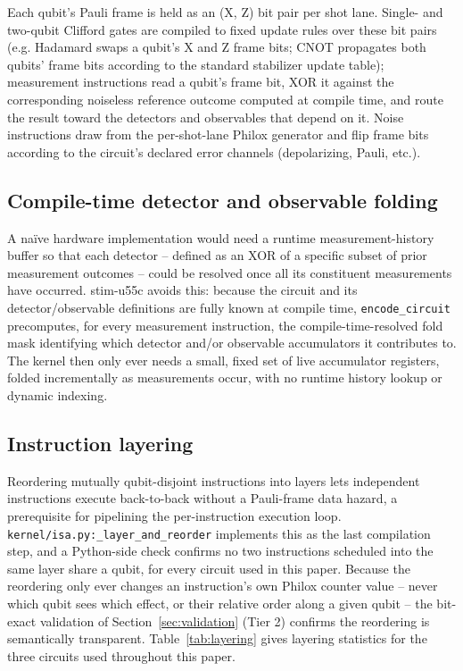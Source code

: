 \documentclass[pdflatex,sn-basic]{sn-jnl}
\begin{document}
Each qubit's Pauli frame is held as an (X, Z) bit pair per shot lane. Single- and two-qubit Clifford gates are compiled to fixed update rules over these bit pairs (e.g. Hadamard swaps a qubit's X and Z frame bits; CNOT propagates both qubits' frame bits according to the standard stabilizer update table); measurement instructions read a qubit's frame bit, XOR it against the corresponding noiseless reference outcome computed at compile time, and route the result toward the detectors and observables that depend on it. Noise instructions draw from the per-shot-lane Philox generator and flip frame bits according to the circuit's declared error channels (depolarizing, Pauli, etc.).

\subsection{Compile-time detector and observable folding}

A na\"ive hardware implementation would need a runtime measurement-history buffer so that each detector -- defined as an XOR of a specific subset of prior measurement outcomes -- could be resolved once all its constituent measurements have occurred. stim-u55c avoids this: because the circuit and its detector/observable definitions are fully known at compile time, \texttt{encode\_circuit} precomputes, for every measurement instruction, the compile-time-resolved fold mask identifying which detector and/or observable accumulators it contributes to. The kernel then only ever needs a small, fixed set of live accumulator registers, folded incrementally as measurements occur, with no runtime history lookup or dynamic indexing.

\subsection{Instruction layering}

Reordering mutually qubit-disjoint instructions into layers lets independent instructions execute back-to-back without a Pauli-frame data hazard, a prerequisite for pipelining the per-instruction execution loop. \texttt{kernel/isa.py:\_layer\_and\_reorder} implements this as the last compilation step, and a Python-side check confirms no two instructions scheduled into the same layer share a qubit, for every circuit used in this paper. Because the reordering only ever changes an instruction's own Philox counter value -- never which qubit sees which effect, or their relative order along a given qubit -- the bit-exact validation of Section~\ref{sec:validation} (Tier 2) confirms the reordering is semantically transparent. Table~\ref{tab:layering} gives layering statistics for the three circuits used throughout this paper.
\end{document}
